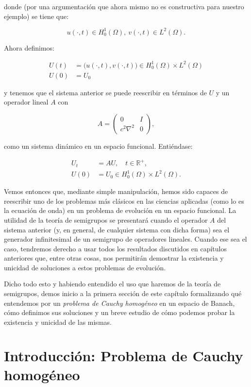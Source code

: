 donde (por una argumentación que ahora mismo no es constructiva para nuestro ejemplo) se tiene que:

\[u(\cdot, t) \in H_0^1(\Omega), \ v(\cdot, t) \in L^2(\Omega).\]

Ahora definimos:

\begin{align*}
    U(t) &= \big(u(\cdot, t), v(\cdot, t)\big) \in H_0^1(\Omega) \times L^2(\Omega)\\
    U(0) &= U_0
\end{align*}

y tenemos que el sistema anterior se puede reescribir en términos de $U$ y un operador lineal $A$ con

\[A = 
    \begin{pmatrix}
    0 & I \\
    c^2\nabla^2 & 0
    \end{pmatrix},
\]

como un sistema dinámico en un espacio funcional. Entiéndase:

\begin{align}
    \label{eqOndaFuncional}
    U_t &= AU, \quad t \in \mathbb{R}^+,\\
    U(0) &= U_0 \in H_0^1(\Omega) \times L^2(\Omega).
\end{align}

Vemos entonces que, mediante simple manipulación, hemos sido capaces de reescribir uno de los problemas más clásicos en las ciencias aplicadas (como lo es la ecuación de onda) en un problema de evolución en un espacio funcional. La utilidad de la teoría de semigrupos se presentará cuando el operador $A$ del sistema anterior (y, en general, de cualquier sistema con dicha forma) sea el generador infinitesimal de un semigrupo de operadores lineales. Cuando ese sea el caso, tendremos derecho a usar todos los resultados discutidos en capítulos anteriores que, entre otras cosas, nos permitirán demostrar la existencia y unicidad de soluciones a estos problemas de evolución.

Dicho todo esto y habiendo entendido el uso que haremos de la teoría de semigrupos, demos inicio a la primera sección de este capítulo formalizando qué entendemos por un \textit{problema de Cauchy homogéneo} en un espacio de Banach, cómo definimos sus soluciones y un breve estudio de cómo podemos probar la existencia y unicidad de las mismas.

\section{Introducción: Problema de Cauchy homogéneo}
\label{ch:cauchy:section:Hom}

